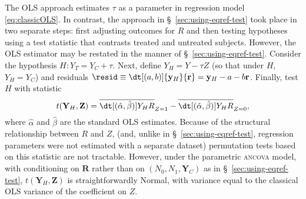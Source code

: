 The OLS approach estimates $\tau$ as a parameter in regression model
\eqref{eq:classicOLS}. In contrast, the approach in
\S~\ref{sec:using-eqref-test} took place in two separate steps:
first adjusting outcomes for $R$ and then testing hypotheses using a test
statistic that contrasts treated and untreated subjects.
However, the OLS estimator may be restated in the manner of \S~\ref{sec:using-eqref-test}.
Consider the hypothesis $H: Y_{T} = Y_{C} + \tau$.
Next, define ${{Y}_H} = {Y} - \tau {Z}$ (so that under $H$, $Y_H=Y_C$)
and residuals $\resid\equiv\dt[(a, b)]{\mathbf{y}_{H}}{ \mathbf{r}} = {\mathbf{y}_H} - a -
b\mathbf{r}$.
Finally, test $H$ with statistic
\begin{equation*}
t(\mathbf{Y}_H , \mathbf{Z}) =
\overline{\dt[(\hat{\alpha},\hat{\beta})]{{{Y}_H}}{ {R}}}_{Z=1} -
\overline{\dt[(\hat{\alpha},\hat{\beta})]{{{Y}_H}}{ {R}}}_{Z=0},
\end{equation*}
where $\hat{\alpha}$ and $\hat{\beta}$ are the standard OLS estimates.
Because of the structural relationship
between $R$ and $Z$, (and, unlike in
\S~\ref{sec:using-eqref-test}, regression parameters were not estimated
with a separate dataset)
permutation tests based on this statistic are not tractable.
However, under the parametric \textsc{ancova} model, with
conditioning on $\mathbf{R}$ rather than on $(N_{0}, N_{1},
\mathbf{Y}_{C})$ as in \S~\ref{sec:using-eqref-test},
$t(\mathbf{Y}_H , \mathbf{Z})$ is straightforwardly Normal, with
variance equal to the classical OLS variance of the coefficient on
$Z$.


